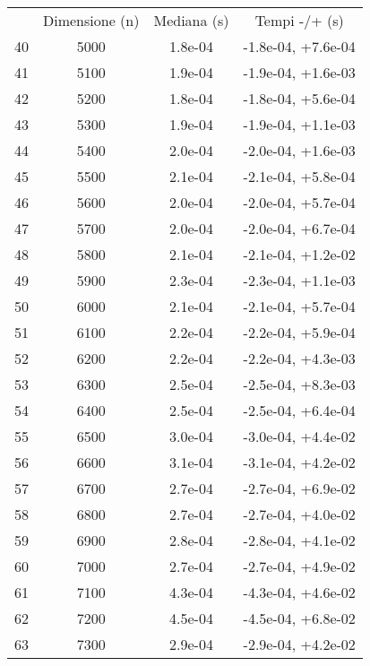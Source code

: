 \begin{table}
\centering
\begin{adjustbox}{width=1\textwidth/2}
\begin{tabular}{|c|c|c|c|}
\hline
 & Dimensione (n) & Mediana (s) & Tempi -/+ (s) \\
40 & 5000 & 1.8e-04 & -1.8e-04, +7.6e-04 \\
\cline{1-4}
41 & 5100 & 1.9e-04 & -1.9e-04, +1.6e-03 \\
\cline{1-4}
42 & 5200 & 1.8e-04 & -1.8e-04, +5.6e-04 \\
\cline{1-4}
43 & 5300 & 1.9e-04 & -1.9e-04, +1.1e-03 \\
\cline{1-4}
44 & 5400 & 2.0e-04 & -2.0e-04, +1.6e-03 \\
\cline{1-4}
45 & 5500 & 2.1e-04 & -2.1e-04, +5.8e-04 \\
\cline{1-4}
46 & 5600 & 2.0e-04 & -2.0e-04, +5.7e-04 \\
\cline{1-4}
47 & 5700 & 2.0e-04 & -2.0e-04, +6.7e-04 \\
\cline{1-4}
48 & 5800 & 2.1e-04 & -2.1e-04, +1.2e-02 \\
\cline{1-4}
49 & 5900 & 2.3e-04 & -2.3e-04, +1.1e-03 \\
\cline{1-4}
50 & 6000 & 2.1e-04 & -2.1e-04, +5.7e-04 \\
\cline{1-4}
51 & 6100 & 2.2e-04 & -2.2e-04, +5.9e-04 \\
\cline{1-4}
52 & 6200 & 2.2e-04 & -2.2e-04, +4.3e-03 \\
\cline{1-4}
53 & 6300 & 2.5e-04 & -2.5e-04, +8.3e-03 \\
\cline{1-4}
54 & 6400 & 2.5e-04 & -2.5e-04, +6.4e-04 \\
\cline{1-4}
55 & 6500 & 3.0e-04 & -3.0e-04, +4.4e-02 \\
\cline{1-4}
56 & 6600 & 3.1e-04 & -3.1e-04, +4.2e-02 \\
\cline{1-4}
57 & 6700 & 2.7e-04 & -2.7e-04, +6.9e-02 \\
\cline{1-4}
58 & 6800 & 2.7e-04 & -2.7e-04, +4.0e-02 \\
\cline{1-4}
59 & 6900 & 2.8e-04 & -2.8e-04, +4.1e-02 \\
\cline{1-4}
60 & 7000 & 2.7e-04 & -2.7e-04, +4.9e-02 \\
\cline{1-4}
61 & 7100 & 4.3e-04 & -4.3e-04, +4.6e-02 \\
\cline{1-4}
62 & 7200 & 4.5e-04 & -4.5e-04, +6.8e-02 \\
\cline{1-4}
63 & 7300 & 2.9e-04 & -2.9e-04, +4.2e-02 \\

\end{tabular}
\end{adjustbox}
\end{table}
